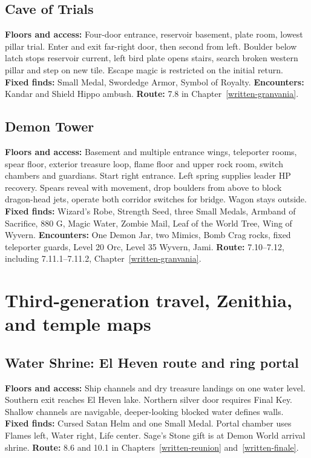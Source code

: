 \subsection{Cave of Trials}
\label{atlas-trials}
\textbf{Floors and access:} Four-door entrance, reservoir basement, plate room, lowest pillar trial. Enter and exit far-right door, then second from left. Boulder below latch stops reservoir current, left bird plate opens stairs, search broken western pillar and step on new tile. Escape magic is restricted on the initial return. \textbf{Fixed finds:} Small Medal, Swordedge Armor, Symbol of Royalty. \textbf{Encounters:} Kandar and Shield Hippo ambush. \textbf{Route:} 7.8 in Chapter~\ref{written-granvania}.

\subsection{Demon Tower}
\label{atlas-demon-tower}
\textbf{Floors and access:} Basement and multiple entrance wings, teleporter rooms, spear floor, exterior treasure loop, flame floor and upper rock room, switch chambers and guardians. Start right entrance. Left spring supplies leader HP recovery. Spears reveal with movement, drop boulders from above to block dragon-head jets, operate both corridor switches for bridge. Wagon stays outside. \textbf{Fixed finds:} Wizard's Robe, Strength Seed, three Small Medals, Armband of Sacrifice, 880 G, Magic Water, Zombie Mail, Leaf of the World Tree, Wing of Wyvern. \textbf{Encounters:} One Demon Jar, two Mimics, Bomb Crag rocks, fixed teleporter guards, Level 20 Orc, Level 35 Wyvern, Jami. \textbf{Route:} 7.10--7.12, including 7.11.1--7.11.2, Chapter~\ref{written-granvania}.

\section{Third-generation travel, Zenithia, and temple maps}
\subsection{Water Shrine: El Heven route and ring portal}
\label{atlas-water-shrine}
\textbf{Floors and access:} Ship channels and dry treasure landings on one water level. Southern exit reaches El Heven lake. Northern silver door requires Final Key. Shallow channels are navigable, deeper-looking blocked water defines walls. \textbf{Fixed finds:} Cursed Satan Helm and one Small Medal. Portal chamber uses Flames left, Water right, Life center. Sage's Stone gift is at Demon World arrival shrine. \textbf{Route:} 8.6 and 10.1 in Chapters~\ref{written-reunion} and~\ref{written-finale}.

